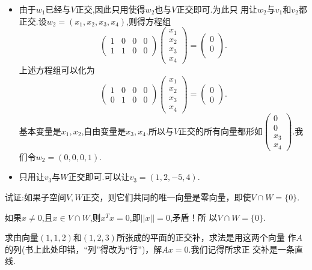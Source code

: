 ﻿\documentclass{book} \usepackage{exsheets} \usepackage{xeCJK}
\begin{document}
\begin{solution}
  \begin{itemize}
  \item  由于$w_1$已经与$V$正交,因此只用使得$w_{2}$也与$V$正交即可.为此只
    用让$w_2$与$v_1$和$v_2$都正交.设$w_2=(x_1,x_2,x_3,x_4)$,则得方程组
$$
\begin{pmatrix}
  1&0&0&0\\
  1&1&0&0
\end{pmatrix}
\begin{pmatrix}
  x_1\\
  x_2\\
  x_3\\
  x_4
\end{pmatrix}=
\begin{pmatrix}
  0\\
  0\\
\end{pmatrix}.
$$
上述方程组可以化为
$$
\begin{pmatrix}
  1&0&0&0\\
  0&1&0&0
\end{pmatrix}
\begin{pmatrix}
  x_1\\
  x_2\\
  x_3\\
  x_4
\end{pmatrix}=
\begin{pmatrix}
  0\\
  0
\end{pmatrix}.
$$
基本变量是$x_1,x_2$,自由变量是$x_3,x_4$.所以与$V$正交的所有向量都形如$
\begin{pmatrix}
  0\\
  0\\
  x_3\\
  x_4
\end{pmatrix}
$.我们令$w_2=(0,0,0,1)$.
\item   只用让$v_3$与$W$正交即可.可以让$v_3=(1,2,-5,4)$.
\end{itemize}
\end{solution}
\begin{question}
  试证:如果子空间$V,W$正交，则它们共同的唯一向量是零向量，即使$V\cap
  W=\{0\}$.
\end{question}
\begin{solution}
  如果$x\neq 0$,且$x\in V\cap W$,则$x^Tx=0$,即$||x||=0$,矛盾！所
  以$V\cap W=\{0\}$.
\end{solution}
\begin{question}
  求由向量$(1,1,2)$和$(1,2,3)$所张成的平面的正交补，求法是用这两个向量
  作$A$的列(书上此处印错，“列”得改为“行”)，解$Ax=0$.我们记得所求正
  交补是一条直线.
\end{question}
\end{document}
